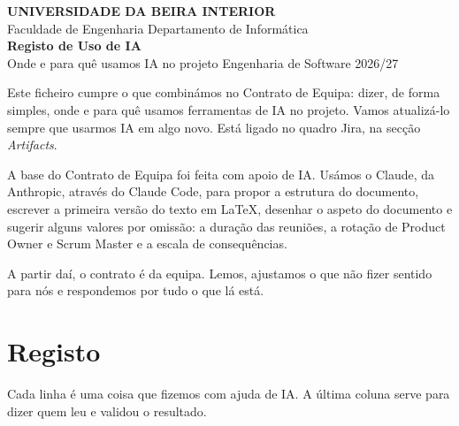 \documentclass[11pt,a4paper]{article}
\begin{document}
\thispagestyle{primeira}

\begin{tcolorbox}[colback=azul, colframe=azul, coltext=white, arc=3pt, boxrule=0pt,
    left=16pt, right=16pt, top=14pt, bottom=14pt]
  \sffamily
  {\footnotesize\bfseries\MakeUppercase{Universidade da Beira Interior}}\\[2pt]
  {\footnotesize Faculdade de Engenharia \textperiodcentered{} Departamento de Informática}\\[16pt]
  {\fontsize{28}{32}\selectfont\bfseries Registo de Uso de IA}\\[4pt]
  {\large Onde e para quê usamos IA no projeto \textperiodcentered{} Engenharia de Software 2026/27}
\end{tcolorbox}

Este ficheiro cumpre o que combinámos no Contrato de Equipa: dizer, de forma simples, onde e para quê usamos ferramentas de IA no projeto. Vamos atualizá-lo sempre que usarmos IA em algo novo. Está ligado no quadro Jira, na secção \textit{Artifacts}.

\begin{tcolorbox}[caixa, title={Declaração}, colback=azulclaro!60]
  A base do Contrato de Equipa foi feita com apoio de IA. Usámos o Claude, da Anthropic, através do Claude Code, para propor a estrutura do documento, escrever a primeira versão do texto em LaTeX, desenhar o aspeto do documento e sugerir alguns valores por omissão: a duração das reuniões, a rotação de Product Owner e Scrum Master e a escala de consequências.

  A partir daí, o contrato é da equipa. Lemos, ajustamos o que não fizer sentido para nós e respondemos por tudo o que lá está.
\end{tcolorbox}

\section{Registo}

Cada linha é uma coisa que fizemos com ajuda de IA. A última coluna serve para dizer quem leu e validou o resultado.
\end{document}
